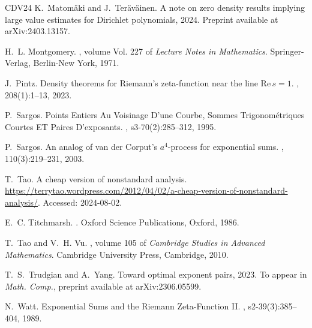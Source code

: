 \documentclass[a4paper, 10pt]{amsart}
\begin{document}
\begin{thebibliography}{CDV24}
K.~Matom\"aki and J.~Ter\"av\"ainen.
\newblock A note on zero density results implying large value estimates for Dirichlet polynomials, 2024. Preprint available at arXiv:2403.13157.

H.~L. Montgomery.
, volume Vol. 227 of {\em Lecture Notes in Mathematics}.
\newblock Springer-Verlag, Berlin-New York, 1971.


J.~Pintz.
\newblock Density theorems for {Riemann}'s zeta-function near the line $\mathrm{Re}\,s = 1$.
, 208(1):1--13, 2023.

P.~Sargos.
\newblock Points {Entiers} {Au} {Voisinage} {D}'une {Courbe}, {Sommes} {Trigonom\'{e}triques} {Courtes} {ET} {Paires} {D}'exposants.
, s3-70(2):285--312, 1995.

P.~Sargos.
\newblock An analog of van der {Corput}'s $a^4$-process for exponential sums.
, 110(3):219--231, 2003.

T.~Tao.
\newblock A cheap version of nonstandard analysis.
\newblock \url{https://terrytao.wordpress.com/2012/04/02/a-cheap-version-of-nonstandard-analysis/}.
\newblock Accessed: 2024-08-02.

E.~C. Titchmarsh.
.
\newblock Oxford Science Publications, Oxford, 1986.

T.~Tao and V.~H. Vu.
, volume 105 of {\em Cambridge Studies in Advanced Mathematics}.
\newblock Cambridge University Press, Cambridge, 2010.

T.~S.~Trudgian and A.~Yang.
\newblock Toward optimal exponent pairs, 2023. To appear in {\em Math. Comp.}, preprint available at arXiv:2306.05599.

N.~Watt.
\newblock Exponential {Sums} and the {Riemann} {Zeta}-{Function} {II}.
, s2-39(3):385--404, 1989.

\end{thebibliography}
\end{document}
